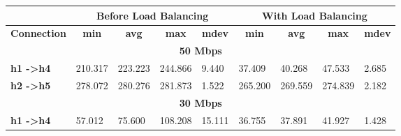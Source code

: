 \begin{table}[h!]
\centering
\begin{tabular}{l|l|l|l|l|l|l|l|l|}
\cline{2-9}
                                                   & \multicolumn{4}{c|}{\textbf{Before Load Balancing}}                                                                                            & \multicolumn{4}{c|}{\textbf{With Load Balancing}}                                                                                              \\ \hline
\multicolumn{1}{|c|}{\textbf{Connection}}          & \multicolumn{1}{c|}{\textbf{min}} & \multicolumn{1}{c|}{\textbf{avg}} & \multicolumn{1}{c|}{\textbf{max}} & \multicolumn{1}{c|}{\textbf{mdev}} & \multicolumn{1}{c|}{\textbf{min}} & \multicolumn{1}{c|}{\textbf{avg}} & \multicolumn{1}{c|}{\textbf{max}} & \multicolumn{1}{c|}{\textbf{mdev}} \\ \hline
\multicolumn{9}{|c|}{\textbf{50 Mbps}}                                                                                                                                                                                                                                                                                                               \\ \hline
\multicolumn{1}{|l|}{\textbf{h1 -\textgreater h4}} & 210.317                           & 223.223                           & 244.866                           & 9.440                              & 37.409                            & 40.268                            & 47.533                            & 2.685                              \\ \hline
\multicolumn{1}{|l|}{\textbf{h2 -\textgreater h5}} & 278.072                           & 280.276                           & 281.873                           & 1.522                              & 265.200                           & 269.559                           & 274.839                           & 2.182                              \\ \hline
\multicolumn{9}{|c|}{\textbf{30 Mbps}}                                                                                                                                                                                                                                                                                                               \\ \hline
\multicolumn{1}{|l|}{\textbf{h1 -\textgreater h4}} & 57.012                            & 75.600                            & 108.208                           & 15.111                             & 36.755                            & 37.891                            & 41.927                            & 1.428                              \\ \hline

\end{tabular}
\end{table}
